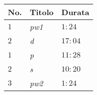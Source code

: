 \documentclass{standalone}
\begin{document}
    \begin{tabular}{l l l}
        \toprule
        \textbf{No.} & \textbf{Titolo} & \textbf{Durata} \\
        \midrule
        \(1\)            & \emph{\acrlong{pw1}}     & \(1:24\) \\
        \(2\)       & \emph{\acrlong{d}}   & \(17:04\) \\
        \midrule
        \(1\)   & \emph{\acrlong{p}}    & \(11:28\)\\ 
        \(2\) & \emph{\acrlong{s}}     & \(10:20\)\\
        \(3\)    & \emph{\acrlong{pw2}}    & \(1:24\) \\
        \bottomrule
    \end{tabular}
\end{document}

